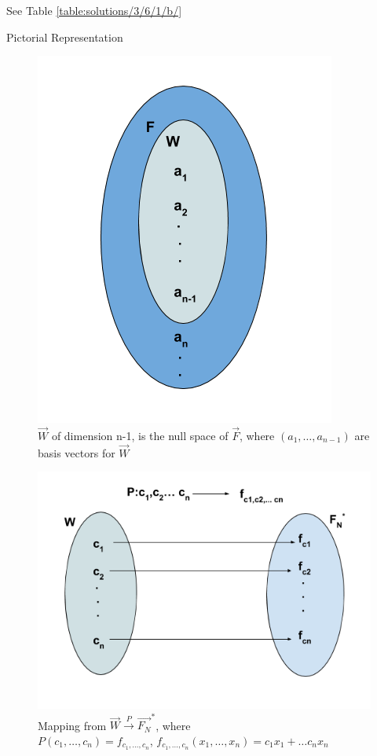 See Table \ref{table:solutions/3/6/1/b/}


%
%
{Pictorial Representation}
\begin{figure}[h!]
\centering
\includegraphics[scale = 0.5]{solutions/3/6/1/b/W_Nullspace.png}
\caption{$\vec{W}$ of dimension n-1, is the null space of $\vec{F}$, where $(a_1,\hdots, a_{n-1})$ are basis vectors for $\vec{W}$}
\end{figure}
\pagebreak
\begin{figure}[h!]
\centering
\includegraphics[scale=0.5]{solutions/3/6/1/b/WtoFn.png}
\caption{Mapping from $\vec{W} \xrightarrow{P} \vec{F_N}^*$, where \\ $P(c_1,\hdots,c_n) = f_{c_1,\hdots,c_n}$, $f_{c_1,\hdots,c_n}(x_1, \hdots , x_n) = c_1x_1 + \hdots c_nx_n$} 
\label{fig:1solutions/3/6/1/b/}
\end{figure}
